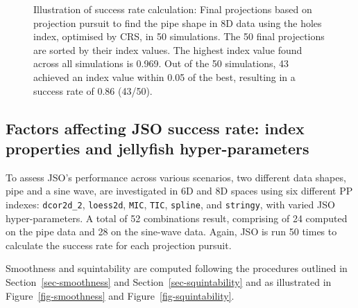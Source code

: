 \documentclass[
  12pt,
]{interact}
\theoremstyle{plain}
\begin{document}
\begin{figure}


\caption{\label{fig-success-rate}Illustration of success rate
calculation: Final projections based on projection pursuit to find the
pipe shape in 8D data using the holes index, optimised by CRS, in 50
simulations. The 50 final projections are sorted by their index values.
The highest index value found across all simulations is 0.969. Out of
the 50 simulations, 43 achieved an index value within 0.05 of the best,
resulting in a success rate of 0.86 (43/50).}

\end{figure}%

\subsection{Factors affecting JSO success rate: index properties and
jellyfish hyper-parameters}\label{sec-app-2}

To assess JSO's performance across various scenarios, two different data
shapes, pipe and a sine wave, are investigated in 6D and 8D spaces using
six different PP indexes: \texttt{dcor2d\_2}, \texttt{loess2d},
\texttt{MIC}, \texttt{TIC}, \texttt{spline}, and \texttt{stringy}, with
varied JSO hyper-parameters. A total of 52 combinations result,
comprising of 24 computed on the pipe data and 28 on the sine-wave data.
Again, JSO is run 50 times to calculate the success rate for each
projection pursuit.

Smoothness and squintability are computed following the procedures
outlined in Section~\ref{sec-smoothness} and
Section~\ref{sec-squintability} and as illustrated in
Figure~\ref{fig-smoothness} and Figure~\ref{fig-squintability}.
\end{document}
